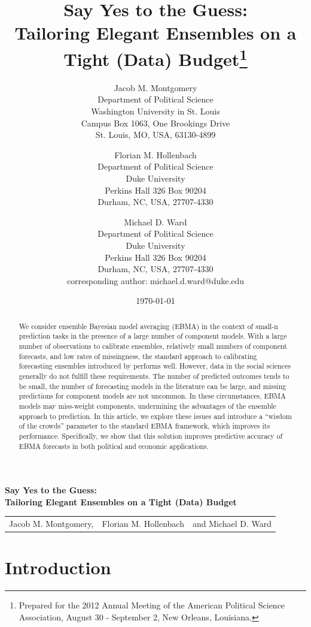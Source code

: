 \documentclass[12pt,fullpage,endnotes]{article}
\title{Say Yes to the Guess: \\ Tailoring Elegant Ensembles on a Tight
  (Data) Budget\thanks{Prepared for the 2012 Annual Meeting of the American Political Science Association, August 30 - September 2, New Orleans, Louisiana. 
    }}
\author{
Jacob M. Montgomery\\
	Department of Political Science\\
	Washington University in St. Louis\\
	Campus Box 1063, One Brookings Drive\\
	St. Louis, MO, USA, 63130-4899 
	\and
Florian M. Hollenbach  \\
	Department of Political Science\\
	Duke University\\
	Perkins Hall 326 Box 90204\\
	Durham, NC, USA, 27707-4330
	\and
Michael D. Ward\\
	Department of Political Science\\
	Duke University\\
	Perkins Hall 326 Box 90204\\
	Durham, NC, USA, 27707-4330\\
	corresponding author: michael.d.ward@duke.edu
}
\date{\today}
\begin{document}
\maketitle
\thispagestyle{empty}
\clearpage
\pagestyle{myheadings}
\newpage
\singlespacing

\thispagestyle{empty}

{\centering \bf \large Say Yes to the Guess: \\ Tailoring Elegant Ensembles on a Tight (Data) Budget \\}


\begin{center}
\begin{tabular}{c@{ }c@{ }c}

Jacob M. Montgomery, & Florian M. Hollenbach & and Michael D. Ward\\
\end{tabular}
\end{center}

\begin{abstract}
  \noindent We consider ensemble Bayesian model averaging (EBMA) in
  the context of small-n prediction tasks in the presence of a large
  number of component models.  With a large number of observations to
  calibrate ensembles, relatively small numbers of component
  forecasts, and low rates of missingness, the standard approach to
  calibrating forecasting ensembles introduced by \cite{Raftery:2005}
  performs well. However, data in the social sciences generally do not
  fulfill these requirements. The number of predicted outcomes tends
  to be small, the number of forecasting models in the literature can
  be large, and missing predictions for component models are not
  uncommon. In these circumstances, EBMA models may miss-weight
  components, undermining the advantages of the ensemble approach to
  prediction.  In this article, we explore these issues and introduce
  a ``wisdom of the crowds'' parameter to the standard EBMA framework,
  which improves its performance. Specifically, we show that this
  solution improves predictive accuracy of EBMA forecasts in both
  political and economic applications.
\end{abstract}

\doublespacing


\setcounter{page}{1}

\section{Introduction}
\end{document}
